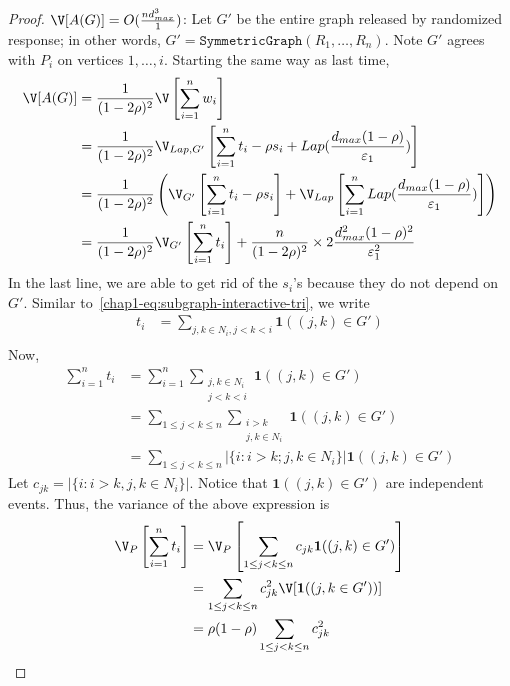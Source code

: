 \begin{proof}
  \noindent
  \textbf{$\V[A(G)] = O(\frac{nd_{max}^3}{1})$}:
  Let $G'$ be the entire graph released by randomized response; in other words,
  $G' = \texttt{SymmetricGraph}(R_1,\ldots, R_n)$. Note $G'$ agrees with $P_i$ on
  vertices $1,\ldots, i$. 
  Starting the same way as last time,
  \begin{align*}
    \V[A(G)] &= \frac{1}{(1-2\rho)^2}\V\left[\sum_{i=1}^n w_i\right] \\
    &= \frac{1}{(1-2\rho)^2}\V_{Lap, G'}\left[\sum_{i=1}^n
    t_i - \rho s_i +
    Lap(\frac{d_{max}(1-\rho)}{\varepsilon_1})\right] \\
    &= \frac{1}{(1-2\rho)^2}\left(\V_{G'}\left[\sum_{i=1}^n
    t_i - \rho s_i \right] +
    \V_{Lap}\left[\sum_{i=1}^n
    Lap(\frac{d_{max}(1-\rho)}{\varepsilon_1})\right]\right) \\
    &= \frac{1}{(1-2\rho)^2}\V_{G'}\left[\sum_{i=1}^n
    t_i \right] + \frac{n}{(1-2\rho)^2}\times
    2\frac{d_{max}^2(1-\rho)^2}{\varepsilon_1^2}
  \end{align*}
  In the last line, we are able to get rid of the $s_i$'s because they do not
  depend on $G'$. Similar to~\eqref{chap1-eq:subgraph-interactive-tri}, we write
  \begin{align*}
    t_i &= \sum_{j,k \in N_i, j<k<i} \textbf{1}((j,k) \in G') \\
  \end{align*}
Now,
  \begin{align*}
    \sum_{i=1}^n t_i &= \sum_{i=1}^n\sum_{\substack{j,k \in N_i \\ j<k<i }} \textbf{1}((j,k) \in
    G') \\
    &= \sum_{1 \leq j < k \leq n} \sum_{\substack{i > k \\ j,k \in N_i
    }} \textbf{1}((j,k) \in G') \\
    &= \sum_{1 \leq j < k \leq n} |\{i : i>k; j,k \in N_i\}| \textbf{1}((j,k)
    \in G')
  \end{align*}
  Let $c_{jk} = |\{i : i>k, j,k \in N_i\}|$. Notice that $\textbf{1}( (j,k) \in G')$
  are independent events. Thus, the variance of the above expression is
  \begin{align}
    \V_P\left[\sum_{i=1}^n t_i\right] &= \V_P \left[\sum_{1 \leq j < k \leq n}
    c_{jk} \textbf{1}( (j,k) \in G') \right] \nonumber \\
    &= \sum_{1 \leq j < k \leq n} c_{jk}^2 \V[\textbf{1}( (j,k \in G')) ]
    \nonumber \\
    &= \rho (1-\rho) \sum_{1 \leq j < k \leq n} c_{jk}^2
    \label{chap1-eq:subgraph-interactive-var}

\end{align}
\end{proof}
